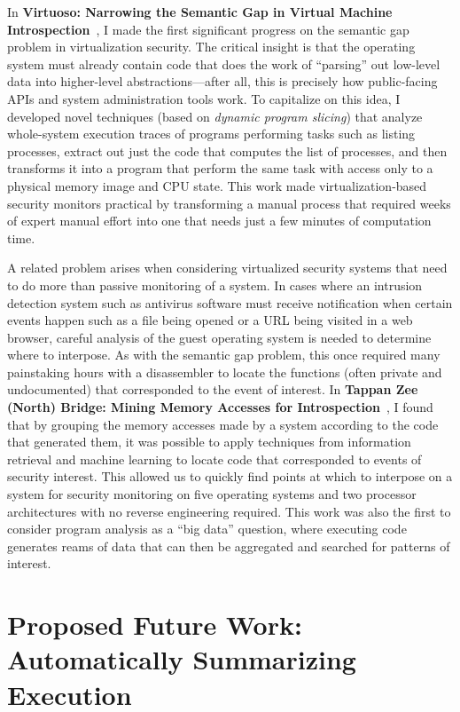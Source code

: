 \documentclass{article}
\begin{document}
In \textbf{Virtuoso: Narrowing the Semantic Gap in Virtual Machine
Introspection}~\cite{dolangavitt2011virtuoso}, I made the first
significant progress on the semantic gap problem in virtualization
security. The critical insight is that the operating system must already
contain code that does the work of ``parsing'' out low-level data into
higher-level abstractions---after all, this is precisely how
public-facing APIs and system administration tools work. To capitalize
on this idea, I developed novel techniques (based on \emph{dynamic
program slicing}) that analyze whole-system execution traces of programs
performing tasks such as listing processes, extract out just the code
that computes the list of processes, and then transforms it into a
program that perform the same task with access only to a physical
memory image and CPU state. This work made virtualization-based security
monitors practical by transforming a manual process that required weeks
of expert manual effort into one that needs just a few minutes of
computation time.

A related problem arises when considering virtualized security systems
that need to do more than passive monitoring of a system. In cases where
an intrusion detection system such as antivirus software must receive
notification when certain events happen such as a file being opened or a
URL being visited in a web browser, careful analysis of the guest
operating system is needed to determine where to interpose. As with the
semantic gap problem, this once required many painstaking hours with a
disassembler to locate the functions (often private and undocumented)
that corresponded to the event of interest. In \textbf{Tappan Zee
(North) Bridge: Mining Memory Accesses for
Introspection}~\cite{dolangavitt2013tzb}, I found that by grouping the
memory accesses made by a system according to the code that generated
them, it was possible to apply techniques from information retrieval and
machine learning to locate code that corresponded to events of security
interest. This allowed us to quickly find points at which to interpose
on a system for security monitoring on five operating systems and two
processor architectures with no reverse engineering required. This work
was also the first to consider program analysis as a ``big data''
question, where executing code generates reams of data that can then be
aggregated and searched for patterns of interest.

\section {Proposed Future Work: \\
Automatically Summarizing Execution}
\end{document}
